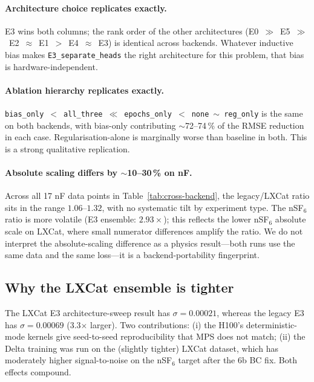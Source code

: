 \documentclass[11pt,a4paper]{article}
\begin{document}
\paragraph{Architecture choice replicates exactly.}
E3 wins both columns; the rank order of the other architectures
(E0~$\gg$~E5~$\gg$~E2~$\approx$~E1~$>$~E4~$\approx$~E3) is identical
across backends.  Whatever inductive bias makes
\texttt{E3\_separate\_heads} the right architecture for this problem,
that bias is hardware-independent.

\paragraph{Ablation hierarchy replicates exactly.}
\texttt{bias\_only}~$<$~\texttt{all\_three}~$\ll$~\texttt{epochs\_only}~$<$~\texttt{none}~$\sim$~\texttt{reg\_only}
is the same on both backends, with bias-only contributing
$\sim$72--74\,\% of the RMSE reduction in each case.
Regularisation-alone is marginally worse than baseline in both.
This is a strong qualitative replication.

\paragraph{Absolute scaling differs by $\sim$10--30\,\% on nF.}
Across all 17 nF data points in Table~\ref{tab:cross-backend}, the
legacy/LXCat ratio sits in the range $1.06$--$1.32$, with no
systematic tilt by experiment type.  The nSF$_6$ ratio is more
volatile (E3 ensemble: $2.93\times$); this reflects the lower nSF$_6$
absolute scale on LXCat, where small numerator differences amplify
the ratio.  We do not interpret the absolute-scaling difference as
a physics result---both runs use the same data and the same loss---it
is a backend-portability fingerprint.

\subsection{Why the LXCat ensemble is tighter}
The LXCat E3 architecture-sweep result has $\sigma=0.00021$, whereas
the legacy E3 has $\sigma=0.00069$ (3.3$\times$ larger).  Two
contributions: (i) the H100's deterministic-mode kernels give
seed-to-seed reproducibility that MPS does not match; (ii) the Delta
training was run on the (slightly tighter) LXCat dataset, which has
moderately higher signal-to-noise on the nSF$_6$ target after the
6b BC fix.  Both effects compound.

\end{document}

